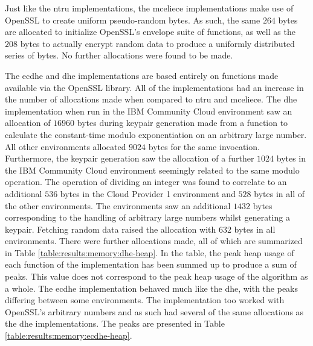 Just like the \gls{ntru} implementations, the \gls{mceliece} implementations make use of OpenSSL to create uniform pseudo-random bytes. As such, the same $264$ bytes are allocated to initialize OpenSSL's envelope suite of functions, as well as the $208$ bytes to actually encrypt random data to produce a uniformly distributed series of bytes. No further allocations were found to be made.

The \gls{ecdhe} and \gls{dhe} implementations are based entirely on functions made available via the OpenSSL library. All of the implementations had an increase in the number of allocations made when compared to \gls{ntru} and \gls{mceliece}. The \gls{dhe} implementation when run in the IBM Community Cloud environment saw an allocation of $16960$ bytes during keypair generation made from a function to calculate the constant-time modulo exponentiation on an arbitrary large number. All other environments allocated $9024$ bytes for the same invocation. Furthermore, the keypair generation saw the allocation of a further $1024$ bytes in the IBM Community Cloud environment seemingly related to the same modulo operation.
The operation of dividing an integer was found to correlate to an additional $536$ bytes in the Cloud Provider 1 environment and $528$ bytes in all of the other environments. The environments saw an additional $1432$ bytes corresponding to the handling of arbitrary large numbers whilst generating a keypair. Fetching random data raised the allocation with $632$ bytes in all environments. There were further allocations made, all of which are summarized in Table \ref{table:results:memory:dhe-heap}. In the table, the peak heap usage of each function of the implementation has been summed up to produce a sum of peaks. This value does not correspond to the peak heap usage of the algorithm as a whole. The \gls{ecdhe} implementation behaved much like the \gls{dhe}, with the peaks differing between some environments. The implementation too worked with OpenSSL's arbitrary numbers and as such had several of the same allocations as the \gls{dhe} implementations. The peaks are presented in Table \ref{table:results:memory:ecdhe-heap}.

